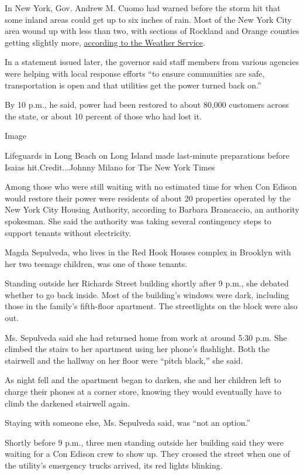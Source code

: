 In New York, Gov. Andrew M. Cuomo had warned before the storm hit that
some inland areas could get up to six inches of rain. Most of the New
York City area wound up with less than two, with sections of Rockland
and Orange counties getting slightly more,
\href{https://nwschat.weather.gov/p.php?pid=202008050051-KOKX-NOUS41-PNSOKX}{according
to the Weather Service}.

In a statement issued later, the governor said staff members from
various agencies were helping with local response efforts ``to ensure
communities are safe, transportation is open and that utilities get the
power turned back on.''

By 10 p.m., he said, power had been restored to about 80,000 customers
across the state, or about 10 percent of those who had lost it.

Image

Lifeguards in Long Beach on Long Island made last-minute preparations
before Isaias hit.Credit...Johnny Milano for The New York Times

Among those who were still waiting with no estimated time for when Con
Edison would restore their power were residents of about 20 properties
operated by the New York City Housing Authority, according to Barbara​
Brancaccio, an authority spokesman. She said the authority was taking
several contingency steps to support tenants without electricity.

Magda Sepulveda, who lives in the Red Hook Houses complex in Brooklyn
with her two teenage children, was one of those tenants.

Standing outside her Richards Street building shortly after 9 p.m., she
debated whether to go back inside. Most of the building's windows were
dark, including those in the family's fifth-floor apartment. The
streetlights on the block were also out.

Ms. Sepulveda said she had returned home from work at around 5:30 p.m.
She climbed the stairs to her apartment using her phone's flashlight.
Both the stairwell and the hallway on her floor were ``pitch black,''
she said.

As night fell and the apartment began to darken, she and her children
left to charge their phones at a corner store, knowing they would
eventually have to climb the darkened stairwell again.

Staying with someone else, Ms. Sepulveda said, was ``not an option.''

Shortly before 9 p.m., three men standing outside her building said they
were waiting for a Con Edison crew to show up. They crossed the street
when one of the utility's emergency trucks arrived, its red lights
blinking.

